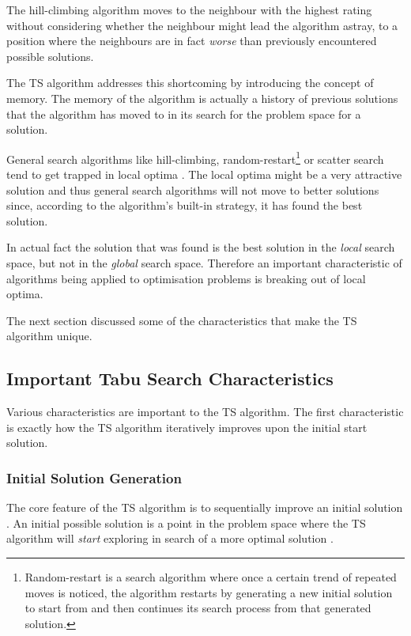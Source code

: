 The hill-climbing algorithm moves to the neighbour with the highest rating without considering whether the neighbour might lead the algorithm astray, to a position where the neighbours are in fact \emph{worse} than previously encountered possible solutions\cite{AIModernApproach}. 

The TS algorithm addresses this shortcoming by introducing the concept of memory\cite{TabuBiddingStrats}. The memory of the algorithm is actually a history of previous solutions that the algorithm has moved to in its search for the problem space for a solution\cite{TabuBiddingStrats}. 

General search algorithms like hill-climbing, random-restart\footnote{Random-restart is a search algorithm where once a certain trend of repeated moves is noticed, the algorithm restarts by generating a new initial solution to start from and then continues its search process from that generated solution\cite{AIModernApproach}.} or scatter search tend to get trapped in local optima \cite{AIModernApproach}. The local optima might be a very attractive solution and thus general search algorithms will not move to better solutions since, according to the algorithm's built-in strategy, it has found the best solution. 

In actual fact the solution that was found is the best solution in the \emph{local} search space, but not in the \emph{global} search space\cite{CompuIntelligenceIntro,AIModernApproach}. Therefore an important characteristic of algorithms being applied to optimisation problems is breaking out of local optima\cite{CompuIntelligenceIntro,AIModernApproach}.

The next section discussed some of the characteristics that make the TS algorithm unique.

\subsection{Important Tabu Search Characteristics}
\label{sec:TScharacteristics}
Various characteristics are important to the TS algorithm. The first characteristic is exactly how the TS algorithm iteratively improves upon the initial start solution.

\subsubsection{Initial Solution Generation}
The core feature of the TS algorithm is to sequentially improve an initial solution \cite{TSHazardous}. An initial possible solution is a point in the problem space where the TS algorithm will \emph{start} exploring in search of a more optimal solution \cite{AIModernApproach,TSHazardous}.

